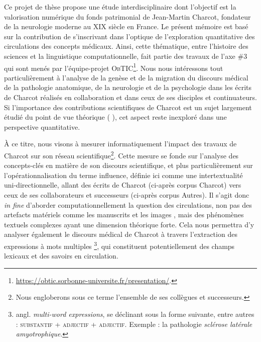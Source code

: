 Ce projet de thèse propose une étude interdisciplinaire dont l'objectif est la valorisation numérique du fonds patrimonial de Jean-Martin Charcot, fondateur de la neurologie moderne au XIX\ieme{} siècle en France. 
Le présent mémoire est basé sur la contribution de \citet{petkovic2023circulation} s'inscrivant dans l'optique de l'exploration quantitative des circulations des concepts médicaux. Ainsi, cette thématique, entre l'histoire des sciences et la linguistique computationnelle, fait partie des travaux de l'axe \#3 qui sont menés par l'équipe-projet \textsc{ObTIC}\footnote{\url{https://obtic.sorbonne-universite.fr/presentation/}.}. 
Nous nous intéressons tout particulièrement à l'analyse de la genèse et de la migration du discours médical de la pathologie anatomique, de la neurologie et de la psychologie dans les écrits de Charcot réalisés en collaboration et dans ceux de ses disciples et continuateurs. Si l'importance des contributions scientifiques de Charcot est un sujet largement étudié du point de vue théorique (\citealp{bogousslavsky2011following,broussolle2012,camargo2024} ), cet aspect reste inexploré dans une perspective quantitative.

À ce titre, nous visons à mesurer informatiquement l'impact des travaux de Charcot sur son réseau scientifique\footnote{Nous engloberons sous ce terme l'ensemble de ses collègues et successeurs.}. Cette mesure se fonde sur l'analyse des concepts-clés en matière de son discours scientifique, et plus particulièrement sur l'opérationnalisation du terme \og{}influence\fg{}, définie ici comme une intertextualité uni-directionnelle, allant des écrits de Charcot (ci-après corpus \og{}Charcot\fg{}) vers ceux de ses collaborateurs et successeurs (ci-après corpus \og{}Autres\fg{}). Il s'agit donc \textit{in fine} d'aborder computationnellement la question des circulations, non pas des artefacts matériels comme les manuscrits \citep{gabay2021katabase} et les images \citep{joyeux2019visual}, mais des phénomènes textuels complexes \citep{manjavacas} ayant une dimension théorique forte. Cela nous permettra d'y analyser également le discours médical de Charcot à travers l'extraction des expressions à mots multiples \citep[p. 96]{nerima2006}\footnote{angl. \textit{multi-word expressions}, se déclinant sous la forme suivante, entre autres : \textsc{substantif + adjectif + adjectif}. Exemple : la pathologie \textit{sclérose latérale amyotrophique}.}, qui constituent potentiellement des champs lexicaux et des savoirs en circulation.

